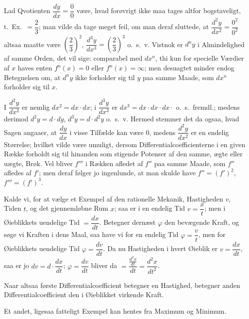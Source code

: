 \documentclass[12pt]{book}
\newcommand{\opage}[1]{\marginnote{\footnotesize\textit{[#1]}}}
\begin{document}
Lad Qvotienten $\dfrac{dy}{dx} = \dfrac{0}{0}$ være, hvad forøvrigt ikke maa tages
altfor bogstaveligt, t.\ Ex.\ $= \dfrac{2}{3}$; man vilde da tage meget feil, om man
deraf sluttede, at $\dfrac{d^{2}y}{dx^{2}} = \dfrac{0^{2}}{0^{2}}$
\opage{61} altsaa maatte være $\left(\dfrac{2}{3}\right)^{2}$,
$\dfrac{d^{3}y}{dx^{3}} = \left(\dfrac{2}{3}\right)^{3}$ o.\ s.\ v. Vistnok er
$d^{n}y$ i Almindelighed af samme Orden, det vil sige: comparabel med $dx^{n}$, thi
kun for specielle Værdier af $x$ haves enten $f^{n}(x) = 0$ eller
$f^{n}(x) = \infty$; men desuagtet minder endog Betegnelsen om, at $d^{n}y$ ikke
forholder sig til $y$ paa samme Maade, som $dx^{n}$ forholder sig til $x$.

I $\dfrac{d^{2}y}{dx^{2}}$ er nemlig $dx^{2} = dx\cdot dx$; i
$\dfrac{d^{3}y}{dx^{3}}$ er $dx^{3} = dx\cdot dx\cdot dx\cdot$ o.\ s.\ fremdl.; medens
derimod $d^{2}y = d\cdot dy$, $d^{3}y = d\cdot d^{2}y$ o.\ s.\ v. Hermed stemmer det
da ogsaa, hvad Sagen angaaer, at $\dfrac{dy}{dx}$ i visse Tilfælde kan være 0,
medens $\dfrac{d^{2}y}{dx^{2}}$ er en endelig Størrelse; hvilket vilde være umuligt,
dersom Differentialcoefficienterne i en given Række forholdt sig til hinanden som
stigende Potenser af den samme, ægte eller uægte, Brøk. Vel bliver $f'''$ i Rækken
afledet af $f''$ paa samme Maade, som $f''$ afledes af $f'$; men deraf følger jo
ingenlunde, at man skulde have $f'' = (f')^{2}$, $f''' = (f')^{3}$.

Kalde vi, for at vælge et Exempel af den rationelle Mekanik, Hastigheden $v$, Tiden
$t$, og det gjennemløbne Rum $x$; saa er i en endelig Tid $v = \dfrac{x}{t}$; men i
Øieblikkets uendelige Tid $= \dfrac{dx}{dt}$. Betegner dernæst $\varphi$ den
bevægende Kraft, og søge vi Kraften i dens Maal, saa have vi for en endelig Tid
$\varphi = \dfrac{v}{t}$, men for Øieblikkets uendelige Tid
$\varphi = \dfrac{dv}{dt}$. Da nu Hastigheden i hvert Øieblik er
$v = \dfrac{dx}{dt}$, saa er jo $dv = d\cdot\dfrac{dx}{dt}$;
$\varphi = \dfrac{dv}{dt}$ bliver da $= \dfrac{\frac{d^{2}x}{dt}}{dt}
= \dfrac{d^{2}x}{dt^{2}}$.

\opage{62} Naar altsaa første Differentialcoefficient betegner en Hastighed, betegner anden
Differentialcoefficient den i Øieblikket virkende Kraft.

Et andet, ligesaa fatteligt Exempel kan hentes fra Maximum og Minimum.
\end{document}
